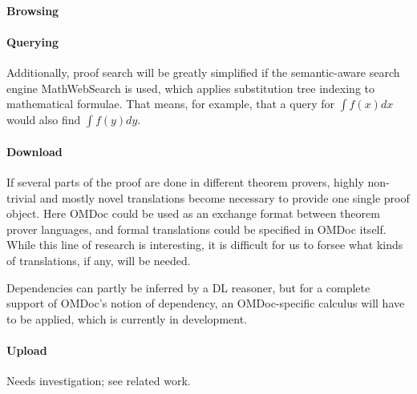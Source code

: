 \paragraph{Browsing}


\paragraph{Querying} Additionally, proof search will be greatly simplified if
the semantic-aware search engine MathWebSearch\cite{KohSuc:asemf06} is used,
which applies substitution tree indexing to mathematical formulae.  That means,
for example, that a query for $\int f(x) dx$ would also find $\int f(y) dy$.

\paragraph{Download} If several parts of the proof are done in different
theorem provers, highly non-trivial and mostly novel translations become
necessary to provide one single proof object. Here OMDoc could be used as an
exchange format between theorem prover languages, and formal translations could
be specified in OMDoc itself.  While this line of research is interesting, it is
difficult for us to forsee what kinds of translations, if any, will be needed.

Dependencies can partly be inferred by a DL reasoner, but for a complete support
of OMDoc's notion of dependency, an OMDoc-specific calculus will have to be
applied, which is currently in development.

\paragraph{Upload} Needs investigation; see related work.

